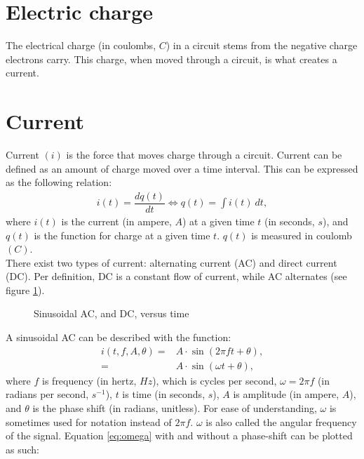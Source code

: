 \section{Electric charge}
The electrical charge (in coulombs, $C$) in a circuit stems from the negative charge electrons carry. This charge, when moved through a circuit, is what creates a current.   
\section{Current}
Current $(i)$ is the force that moves charge through a circuit. Current can be defined as an amount of charge moved over a time interval. This can be expressed as the following relation: \cite[p.~3]{bcircuit5}
\begin{align}
i(t)=\dfrac{dq(t)}{dt} \Leftrightarrow q(t)=\int i(t)\ dt,\label{I=dq/dt}
\end{align}
where $i(t)$ is the current (in ampere, $A$) at a given time $t$ (in seconds, $s$), and $q(t)$ is the function for charge at a given time $t$. $q(t)$ is measured in coulomb $(C)$.
\\
There exist two types of current: alternating current (AC) and direct current (DC). Per definition, DC is a constant flow of current, while AC alternates (see figure \ref{fig:ACDC}). 
\begin{figure}[H] 

\caption{Sinusoidal AC, and DC, versus time}
\label{fig:ACDC}
\end{figure}
\noindent
A sinusoidal AC can be described with the function: 
\begin{align}
i\left(t, f, A, \theta\right) =& A\cdot \sin{\left(2\pi ft + \theta\right)}, \nonumber
\\
=& A \cdot \sin{\left(\omega t + \theta\right)}, \label{eq:omega}
\end{align}
where $f$ is frequency (in hertz, $Hz$), which is cycles per second, $\omega = 2\pi f$ (in radians per second, $s^{-1}$), $t$ is time (in seconds, $s$), $A$ is amplitude (in ampere, $A$), and $\theta$ is the phase shift (in radians, unitless).
For ease of understanding, $\omega$ is sometimes used for notation instead of $2\pi f$. $\omega$ is also called the angular frequency of the signal.
Equation \eqref{eq:omega} with and without a phase-shift can be plotted as such:
